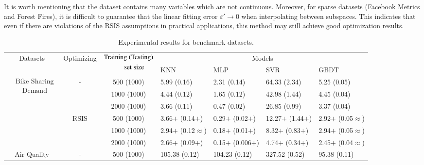 \documentclass[final,3p,times]{elsarticle}
\begin{document}
It is worth mentioning that the dataset contains many variables 
which are not continuous. Moreover, for sparse datasets 
(Facebook Metrics and Forest Fires), it is difficult to guarantee 
that the linear fitting error $\varepsilon'\rightarrow0$ when 
interpolating between subspaces. This indicates that even if there 
are violations of the RSIS assumptions in practical applications, 
this method may still achieve good optimization results. 

 
 

\begin{table}
  \renewcommand{\arraystretch}{0.7}
  \caption{{\color{myred}Experimental} results for benchmark datasets.}\label{tab4}
  \begin{tabularx}{\textwidth}{cccXXXX}
  \toprule
  \multirow{2}{*}{Datasets} & \multirow{2}{*}{Optimizing} & \multirow{2}{*}{$\begin{aligned}&\text{Training\;(Testing)}\\&\qquad\quad\text{set\;size}\end{aligned}$} & \multicolumn{4}{c}{Models} \\ 
  \cmidrule{4-7}
    &  &  & KNN & MLP & SVR & GBDT \\
  \cmidrule{1-7}
  \multirow{6}{*}{$\begin{aligned}&\text{Bike Sharing}\\&\quad\text{Demand}\end{aligned}$} & \multirow{3}{*}{-} & 500 (1000) & 5.99 (0.16) & 2.31 (0.14) & 64.33 (2.34) & 5.25 (0.05) \\
    &  & 1000 (1000) & 4.44 (0.12) & 1.65 (0.12) & 42.98 (1.44) & 4.45 (0.04) \\
    &  & 2000 (1000) & 3.66 (0.11) & 0.47 (0.02) & 26.85 (0.99) & 3.37 (0.04) \\
  \cmidrule{2-7}
    & \multirow{3}{*}{RSIS} & 500 (1000) & 3.66$+$ (0.14$+$) & 0.29$+$ (0.02$+$) & 12.27$+$ (1.44$+$) & 2.92$+$ (0.05$\approx$) \\
    &  & 1000 (1000) & 2.94$+$ (0.12$\approx$) & 0.18$+$ (0.01$+$) & 8.32$+$ (0.83$+$) & 2.94$+$ (0.05$\approx$) \\
    &  & 2000 (1000) & 2.66$+$ (0.09$+$) & 0.15$+$ (0.006$+$) & 4.74$+$ (0.34$+$) & 2.45$+$ (0.04$\approx$) \\
  \cmidrule{1-7}
  \multirow{6}{*}{Air Quality} & \multirow{3}{*}{-} & 500 (1000) & 105.38 (0.12) & 104.23 (0.12) & 327.52 (0.52) & 95.38 (0.11) \\

\end{tabularx}
\end{table}
\end{document}
